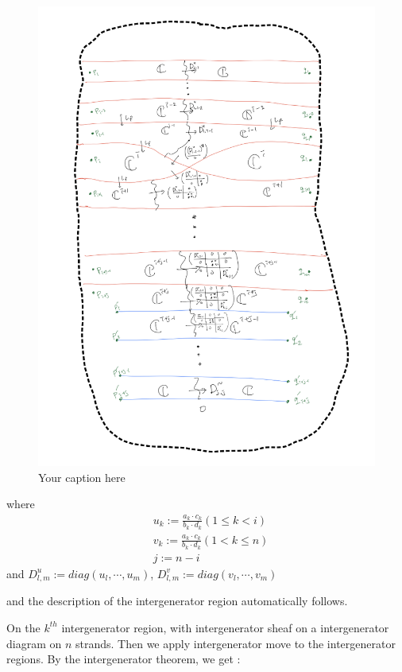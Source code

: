 \begin{figure}[H] %
    \centering
    \includegraphics[width=\linewidth]{diagrams/theorem15/5.png} %
    \caption{Your caption here}
    \label{fig:your-label}
\end{figure}

where
\begin{align*}
	& u_k := \frac{a_k\cdot c_k}{b_k\cdot d_k} (1\leq k <i)\\
	& v_k := \frac{a_k\cdot c_k}{b_k\cdot d_k} (1< k \leq n)\\
	& j := n-i
\end{align*}
and $D_{l,m}^u := diag(u_l,\cdots,u_m)$, $D_{l,m}^v := diag(v_l,\cdots,v_m)$

and the description of the intergenerator region automatically follows.

On the $k^{th}$ intergenerator region, with intergenerator sheaf on a intergenerator diagram on $n$ strands. Then we apply intergenerator move to the intergenerator regions. By the intergenerator theorem, we get :

